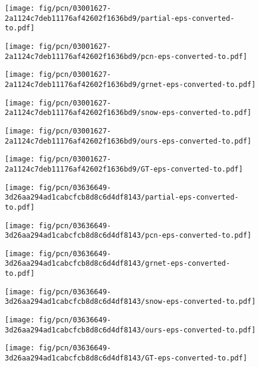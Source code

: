 \begin{figure*}[t]
	\begin{subfigure}{\sunit}
		\centering
		\texttt{[image: fig/pcn/03001627-2a1124c7deb11176af42602f1636bd9/partial-eps-converted-to.pdf]}
	\end{subfigure}\hfill \begin{subfigure}{\sunit}
		\centering
		\texttt{[image: fig/pcn/03001627-2a1124c7deb11176af42602f1636bd9/pcn-eps-converted-to.pdf]}
	\end{subfigure}\hfill \begin{subfigure}{\sunit}
		\centering
		\texttt{[image: fig/pcn/03001627-2a1124c7deb11176af42602f1636bd9/grnet-eps-converted-to.pdf]}
	\end{subfigure}\hfill \begin{subfigure}{\sunit}
		\centering
		\texttt{[image: fig/pcn/03001627-2a1124c7deb11176af42602f1636bd9/snow-eps-converted-to.pdf]}
	\end{subfigure}\hfill \begin{subfigure}{\sunit}
		\centering
		\texttt{[image: fig/pcn/03001627-2a1124c7deb11176af42602f1636bd9/ours-eps-converted-to.pdf]}
	\end{subfigure}\hfill \begin{subfigure}{\sunit}
		\centering
		\texttt{[image: fig/pcn/03001627-2a1124c7deb11176af42602f1636bd9/GT-eps-converted-to.pdf]}
	\end{subfigure}




	\begin{subfigure}{\sunit}
		\centering
		\texttt{[image: fig/pcn/03636649-3d26aa294ad1cabcfcb8d8c6d4df8143/partial-eps-converted-to.pdf]}
	\end{subfigure}\hfill \begin{subfigure}{\sunit}
		\centering
		\texttt{[image: fig/pcn/03636649-3d26aa294ad1cabcfcb8d8c6d4df8143/pcn-eps-converted-to.pdf]}
	\end{subfigure}\hfill \begin{subfigure}{\sunit}
		\centering
		\texttt{[image: fig/pcn/03636649-3d26aa294ad1cabcfcb8d8c6d4df8143/grnet-eps-converted-to.pdf]}
	\end{subfigure}\hfill \begin{subfigure}{\sunit}
		\centering
		\texttt{[image: fig/pcn/03636649-3d26aa294ad1cabcfcb8d8c6d4df8143/snow-eps-converted-to.pdf]}
	\end{subfigure}\hfill \begin{subfigure}{\sunit}
		\centering
		\texttt{[image: fig/pcn/03636649-3d26aa294ad1cabcfcb8d8c6d4df8143/ours-eps-converted-to.pdf]}
	\end{subfigure}\hfill \begin{subfigure}{\sunit}
		\centering
		\texttt{[image: fig/pcn/03636649-3d26aa294ad1cabcfcb8d8c6d4df8143/GT-eps-converted-to.pdf]}
	\end{subfigure}



\end{figure*}
